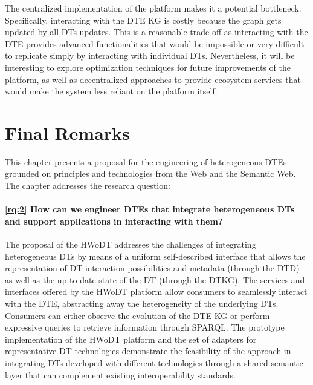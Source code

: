 The centralized implementation of the platform makes it a potential bottleneck. Specifically, interacting with the \ac{DTE} KG is costly because the graph gets updated by all \acp{DT} updates.
%
This is a reasonable trade-off as interacting with the \ac{DTE} provides advanced functionalities that would be impossible or very difficult to replicate simply by interacting with individual \acp{DT}.
%
Nevertheless, it will be interesting to explore optimization techniques for future improvements of the platform, as well as decentralized approaches to provide ecosystem services that would make the system less reliant on the platform itself.



\section{Final Remarks}

This chapter presents a proposal for the engineering of heterogeneous \acp{DTE} grounded on principles and technologies from the Web and the Semantic Web.
%
The chapter addresses the research question:

\paragraph{\ref{rq:2} How can we engineer DTEs that integrate heterogeneous DTs and support
applications in interacting with them?}
The proposal of the \ac{HWoDT} addresses the challenges of integrating heterogeneous \acp{DT} by means of a uniform self-described interface that allows the representation of \ac{DT} interaction possibilities and metadata (through the \ac{DTD}) as well as the up-to-date state of the \ac{DT} (through the \ac{DTKG}).
%
The services and interfaces offered by the \ac{HWoDT} platform allow consumers to seamlessly interact with the \ac{DTE}, abstracting away the heterogeneity of the underlying \acp{DT}.
%
Consumers can either observe the evolution of the \ac{DTE} \ac{KG} or perform expressive queries to retrieve information through SPARQL. 
%
The prototype implementation of the \ac{HWoDT} platform and the set of adapters for representative \ac{DT} technologies demonstrate the feasibility of the approach in integrating \acp{DT} developed with different technologies through a shared semantic layer that can complement existing interoperability standards.
